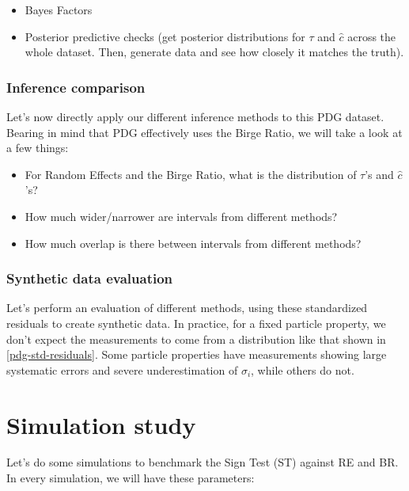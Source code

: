 \documentclass[12pt]{article}
\begin{document}

\begin{itemize}

\item
  Bayes Factors
\item
  Posterior predictive checks (get posterior distributions for $\tau$ and $\hat{c}$ across the whole dataset. Then, generate data and see how closely it matches the truth).
\end{itemize}

\subsubsection{Inference comparison}\label{inference-comparison}

Let's now directly apply our different inference methods to this PDG dataset. Bearing in mind that PDG effectively uses the Birge Ratio, we will take a look at a few things:

\begin{itemize}

\item
  For Random Effects and the Birge Ratio, what is the distribution of $\tau$'s and $\hat c$'s?
\item
  How much wider/narrower are intervals from different methods?
\item
  How much overlap is there between intervals from different methods?
\end{itemize}

\subsubsection{Synthetic data evaluation}\label{synthetic-data-evaluation}

Let's perform an evaluation of different methods, using these standardized residuals to create synthetic data. In practice, for a fixed particle property, we don't expect the measurements to come from a distribution like that shown in \ref{pdg-std-residuals}. Some particle properties have measurements showing large systematic errors and severe underestimation of $\sigma_i$, while others do not.

\section{Simulation study}\label{simulation-study}

Let's do some simulations to benchmark the Sign Test (ST) against RE and BR. In every simulation, we will have these parameters:
\end{document}
